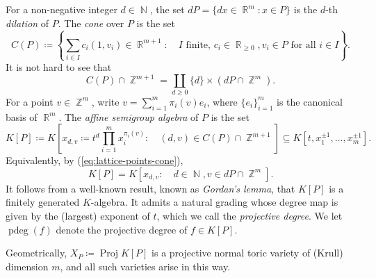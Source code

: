 \documentclass[a4paper,12pt]{amsart}
\theoremstyle{plain}
\theoremstyle{definition}
\theoremstyle{remark}
\DeclareMathOperator{\NN}{\mathbb{N}}
\DeclareMathOperator{\ZZ}{\mathbb{Z}}
\DeclareMathOperator{\RR}{\mathbb{R}}
\DeclareMathOperator{\pdeg}{pdeg}
\DeclareMathOperator{\Proj}{Proj}
\begin{document}
For a non-negative integer $d \in \NN$, the set $dP = \{dx \in \RR^m: x \in P\}$ is the $d$-th \emph{dilation} of $P$. The \emph{cone} over $P$ is the set
\[
C(P) \coloneq \left \{ \sum_{i \in I} c_i (1, v_i) \in \RR^{m + 1}: \quad I \text{ finite, } c_i \in \RR_{\geq 0}, v_i \in P \text{ for all } i \in I \right \}.
\]
It is not hard to see that
\begin{equation}\label{eq:lattice-points-cone}
C(P) \cap \ZZ^{m + 1} = \coprod_{d \geq 0} \{d\} \times (dP \cap \ZZ^m).
\end{equation}
For a point $v \in \ZZ^m$, write $v = \sum_{i = 1}^m \pi_i(v)e_i$, where $\{e_i\}_{i = 1}^m$ is the canonical basis of $\RR^m$. The \emph{affine semigroup algebra} of $P$ is the set
\[
K[P] \coloneq K\left [ x_{d, v} \coloneq t^d\prod_{i =1}^m x_i^{\pi_i(v)}: \quad (d, v) \in C(P) \cap \ZZ^{m + 1} \right ] \subseteq K [t, x_1^{\pm 1}, \ldots, x_m^{\pm 1}].
\]
Equivalently, by (\ref{eq:lattice-points-cone}),
\begin{equation}\label{eq:affine-semigroup-algebra}
    K[P] = K \left [ x_{d, v} : \quad  d \in \NN, v \in dP \cap \ZZ^m \right ].
\end{equation}
It follows from a well-known result, known as \emph{Gordan's lemma}, that $K[P]$ is a finitely generated $K$-algebra. It admits a natural grading whose degree map is given by the (largest) exponent of $t$, which we call the \emph{projective degree}. We let $\pdeg(f)$ denote the projective degree of $f \in K[P]$.

Geometrically, $X_P \coloneq \Proj K[P]$ is a projective normal toric variety of (Krull) dimension $m$, and all such varieties arise in this way. \\
\end{document}
